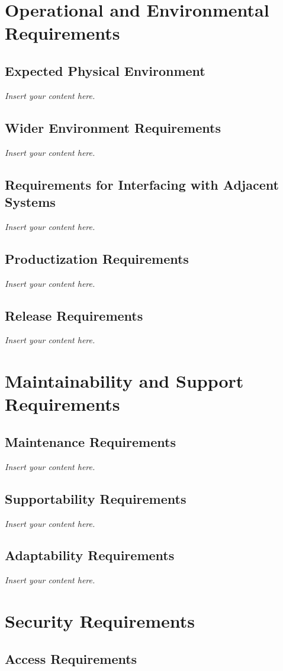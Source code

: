 \documentclass[12pt]{article}
\newcommand{\lips}{\textit{Insert your content here.}}
\begin{document}
\section{Operational and Environmental Requirements}
\subsection{Expected Physical Environment}
\lips
\subsection{Wider Environment Requirements}
\lips
\subsection{Requirements for Interfacing with Adjacent Systems}
\lips
\subsection{Productization Requirements}
\lips
\subsection{Release Requirements}
\lips

\section{Maintainability and Support Requirements}
\subsection{Maintenance Requirements}
\lips
\subsection{Supportability Requirements}
\lips
\subsection{Adaptability Requirements}
\lips

\section{Security Requirements}
\subsection{Access Requirements}
\end{document}
